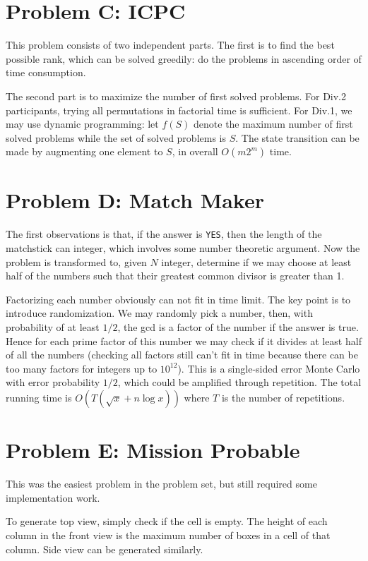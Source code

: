 \documentclass[a4paper,10.5pt,twoside]{article}
\begin{document}
\section*{Problem C: ICPC}

This problem consists of two independent parts. The first is to find the best possible rank, which can be solved greedily: do the problems in ascending order of time consumption.

The second part is to maximize the number of first solved problems. For Div.2 participants, trying all permutations in factorial time is sufficient. For Div.1, we may use dynamic programming: let $f(S)$ denote the maximum number of first solved problems while the set of solved problems is $S$. The state transition can be made by augmenting one element to $S$, in overall $O(m 2^m)$ time.

\section*{Problem D: Match Maker}

The first observations is that, if the answer is \texttt{YES}, then the length of the matchstick can integer, which involves some number theoretic argument. Now the problem is transformed to, given $N$ integer, determine if we may choose at least half of the numbers such that their greatest common divisor is greater than 1.

Factorizing each number obviously can not fit in time limit. The key point is to introduce randomization. We may randomly pick a number, then, with probability of at least $1/2$, the gcd is a factor of the number if the answer is true. Hence  for each prime factor of this number we may check if it divides at least half of all the numbers (checking all factors still can't fit in time because there can be too many factors for integers up to $10^{12}$). This is a single-sided error Monte Carlo with error probability $1/2$, which could be amplified through repetition. The total running time is $O(T(\sqrt{x} + n \log x))$ where $T$ is the number of repetitions.

\section*{Problem E: Mission Probable}

This was the easiest problem in the problem set, but still required some implementation work.

To generate top view, simply check if the cell is empty. The height of each column in the front view is the maximum number of boxes in a cell of that column. Side view can be generated similarly.
\end{document}
